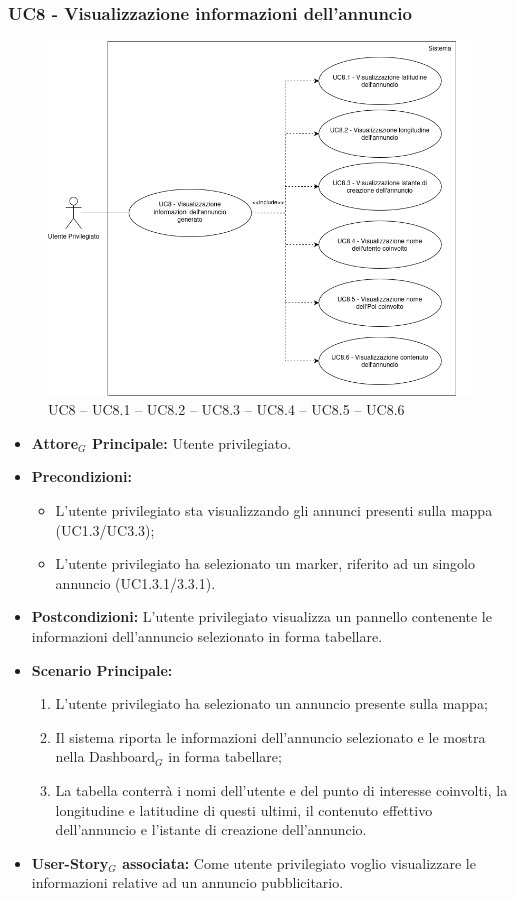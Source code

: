 \documentclass[11pt]{article}
\begin{document}
\begin{justify}
\subsubsection{\textbf{UC8 - Visualizzazione informazioni dell'annuncio}}
\begin{figure}[H]
    \centering
    \includegraphics[width=0.7\linewidth]{UC8image.png}
    \caption{UC8 -- UC8.1 -- UC8.2 -- UC8.3 -- UC8.4 -- UC8.5 -- UC8.6}
    \label{fig:UC8}
\end{figure}
\label{UC8}
\begin{itemize}
    \item \textbf{Attore$_G$ Principale:} Utente privilegiato.
    \item \textbf{Precondizioni:} 
        \begin{itemize}
    	        \item L'utente privilegiato sta visualizzando gli annunci presenti sulla mappa (UC1.3/UC3.3);
    	        \item L'utente privilegiato ha selezionato un marker, riferito ad un singolo annuncio (UC1.3.1/3.3.1).
        \end{itemize}
    \item \textbf{Postcondizioni:} L'utente privilegiato visualizza un pannello contenente le informazioni dell'annuncio selezionato in forma tabellare. 
    \item \textbf{Scenario Principale:} 
        \begin{enumerate}
          \item L'utente privilegiato ha selezionato un annuncio presente sulla mappa;
          \item Il sistema riporta le informazioni dell'annuncio selezionato e le mostra nella Dashboard$_G$ in forma tabellare;
          \item La tabella conterrà i nomi dell'utente e del punto di interesse coinvolti, la longitudine e latitudine di questi ultimi, il contenuto effettivo dell'annuncio e l'istante di creazione dell'annuncio.
	\end{enumerate}
    \item \textbf{User-Story$_G$ associata:} Come utente privilegiato voglio visualizzare le informazioni relative ad un annuncio pubblicitario.
\end{itemize}


\end{justify}
\end{document}
